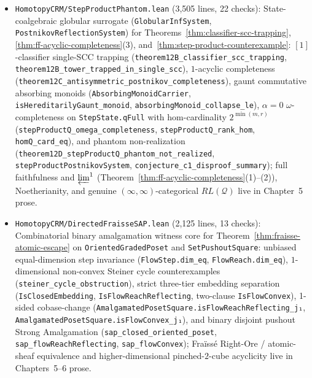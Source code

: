 \documentclass[10pt,twoside,openright]{book}
\theoremstyle{crmplain}
\theoremstyle{crmdef}
\theoremstyle{crmremark}
\begin{document}
\begin{itemize}[leftmargin=1.5em]
  \item \texttt{HomotopyCRM/\allowbreak StepProductPhantom.lean} (3,505 lines, 22 checks): State-coalgebraic globular surrogate (\texttt{GlobularInfSystem}, \texttt{PostnikovReflectionSystem}) for Theorems~\ref{thm:classifier-scc-trapping}, \ref{thm:ff-acyclic-completeness}(3), and~\ref{thm:step-product-counterexample}: $[1]$-classifier single-SCC trapping (\texttt{theorem12B\_\allowbreak classifier\_\allowbreak scc\_\allowbreak trapping}, \texttt{theorem12B\_\allowbreak tower\_\allowbreak trapped\_\allowbreak in\_\allowbreak single\_\allowbreak scc}), $1$-acyclic completeness (\texttt{theorem12C\_\allowbreak antisymmetric\_\allowbreak postnikov\_\allowbreak completeness}), gaunt commutative absorbing monoids (\texttt{Absorbing\allowbreak Monoid\allowbreak Carrier}, \texttt{isHereditarily\allowbreak Gaunt\_\allowbreak monoid}, \texttt{absorbing\allowbreak Monoid\_\allowbreak collapse\_\allowbreak le}), $\alpha = 0$ $\omega$-completeness on \texttt{StepState.qFull} with hom-cardinality $2^{\min(m,r)}$ (\texttt{stepProductQ\_\allowbreak omega\_\allowbreak completeness}, \texttt{stepProductQ\_\allowbreak rank\_\allowbreak hom}, \texttt{homQ\_\allowbreak card\_\allowbreak eq}), and phantom non-realization (\texttt{theorem12D\_\allowbreak stepProductQ\_\allowbreak phantom\_\allowbreak not\_\allowbreak realized}, \texttt{stepProduct\allowbreak Postnikov\allowbreak System}, \texttt{conjecture\_\allowbreak c1\_\allowbreak disproof\_\allowbreak summary}); full faithfulness and $\varprojlim^1$ (Theorem~\ref{thm:ff-acyclic-completeness}(1)--(2)), Noetherianity, and genuine $(\infty,\infty)$-categorical $RL(\mathcal{Q})$ live in Chapter~5 prose.
  \item \texttt{HomotopyCRM/\allowbreak DirectedFraisseSAP.lean} (2,125 lines, 13 checks): Combinatorial binary amalgamation witness core for Theorem~\ref{thm:fraisse-atomic-escape} on \texttt{Oriented\allowbreak GradedPoset} and \texttt{SetPushout\allowbreak Square}: unbiased equal-dimension step invariance (\texttt{FlowStep.\allowbreak dim\_\allowbreak eq}, \texttt{FlowReach.\allowbreak dim\_\allowbreak eq}), $1$-dimensional non-convex Steiner cycle counterexamples (\texttt{steiner\_\allowbreak cycle\_\allowbreak obstruction}), strict three-tier embedding separation (\texttt{IsClosedEmbedding}, \texttt{IsFlowReachReflecting}, two-clause \texttt{IsFlowConvex}), 1-sided cobase-change (\texttt{Amalgamated\allowbreak Poset\allowbreak Square.\allowbreak isFlowReach\allowbreak Reflecting\_\allowbreak j₁}, \texttt{Amalgamated\allowbreak Poset\allowbreak Square.\allowbreak isFlowConvex\_\allowbreak j₁}), and binary disjoint pushout Strong Amalgamation (\texttt{sap\_\allowbreak closed\_\allowbreak oriented\_\allowbreak poset}, \texttt{sap\_\allowbreak flowReachReflecting}, \texttt{sap\_\allowbreak flowConvex}); Fra\"iss\'e Right-Ore / atomic-sheaf equivalence and higher-dimensional pinched-$2$-cube acyclicity live in Chapters~5--6 prose.

\end{itemize}
\end{document}
